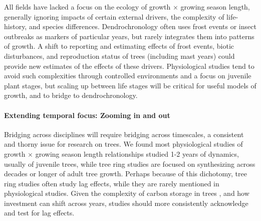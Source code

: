 \documentclass[11pt]{article}
\begin{document}
All fields have lacked a focus on the ecology of growth $\times$ growing season length, generally ignoring impacts of certain external drivers, the complexity of life-history, and species differences. Dendrochronology often uses frost events or insect outbreaks as markers of particular years, but rarely integrates them into patterns of growth. A shift to reporting and estimating effects of frost events, biotic disturbances, and reproduction status of trees (including mast years) could provide new estimates of the effects of these drivers. Physiological studies tend to avoid such complexities through controlled environments and a focus on juvenile plant stages, but scaling up between life stages will be critical for useful models of growth, and to bridge to dendrochronology. %

\paragraph{Extending temporal focus: Zooming in and out}%

Bridging across disciplines will require bridging across timescales, a consistent and thorny issue for research on trees. We found most physiological studies of growth $\times$ growing season length relationships studied 1-2 years of dynamics, usually of juvenile trees, while tree ring studies are focused on synthesizing across decades or longer of adult tree growth. Perhaps because of this dichotomy, tree ring studies often study lag effects, while they are rarely mentioned in physiological studies. Given the complexity of carbon storage in trees \citep{finzi2020,thompson2023no,anderson2022drives}, and how investment can shift across years, studies should more consistently acknowledge and test for lag effects. %
\end{document}
